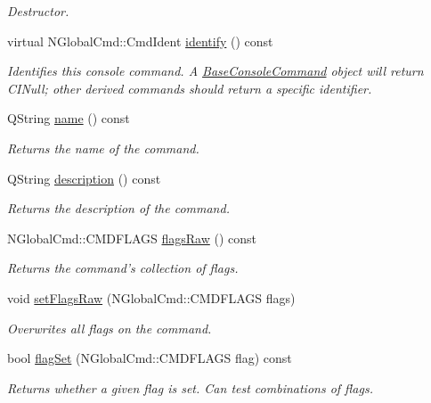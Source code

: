 \begin{DoxyCompactItemize}
\begin{DoxyCompactList}\small\item\em Destructor. \end{DoxyCompactList}\item 
virtual N\-Global\-Cmd\-::\-Cmd\-Ident \hyperlink{class_base_console_command_a8c1fe488f1e24c6bd4891225eb9bb122}{identify} () const 
\begin{DoxyCompactList}\small\item\em Identifies this console command. A \hyperlink{class_base_console_command}{Base\-Console\-Command} object will return C\-I\-Null; other derived commands should return a specific identifier. \end{DoxyCompactList}\item 
Q\-String \hyperlink{class_base_console_command_addf7b841bac36ffc45dd79ec1e697e52}{name} () const 
\begin{DoxyCompactList}\small\item\em Returns the name of the command. \end{DoxyCompactList}\item 
Q\-String \hyperlink{class_base_console_command_a8eaacc83646c4cca95a772a623343988}{description} () const 
\begin{DoxyCompactList}\small\item\em Returns the description of the command. \end{DoxyCompactList}\item 
N\-Global\-Cmd\-::\-C\-M\-D\-F\-L\-A\-G\-S \hyperlink{class_base_console_command_a2e8b8d3a73e0684c7992945fd5d0a216}{flags\-Raw} () const 
\begin{DoxyCompactList}\small\item\em Returns the command's collection of flags. \end{DoxyCompactList}\item 
void \hyperlink{class_base_console_command_ac6ff6169ab06ae43d76d0b3c2e5336ff}{set\-Flags\-Raw} (N\-Global\-Cmd\-::\-C\-M\-D\-F\-L\-A\-G\-S flags)
\begin{DoxyCompactList}\small\item\em Overwrites all flags on the command. \end{DoxyCompactList}\item 
bool \hyperlink{class_base_console_command_a021a4299766424a10f1ec9398c6edb3e}{flag\-Set} (N\-Global\-Cmd\-::\-C\-M\-D\-F\-L\-A\-G\-S flag) const 
\begin{DoxyCompactList}\small\item\em Returns whether a given flag is set. Can test combinations of flags. \end{DoxyCompactList}\item 

\end{DoxyCompactItemize}
